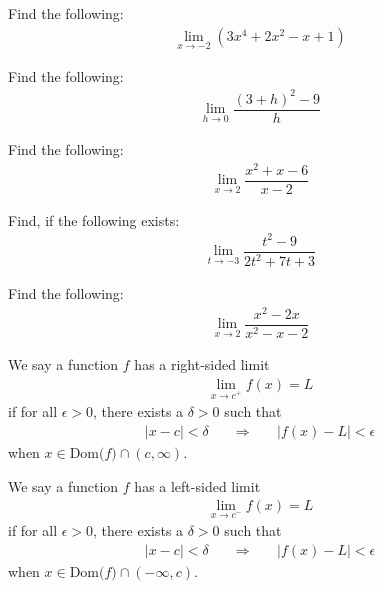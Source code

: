 \begin{exercise}
Find the following:
\begin{align*}
\lim_{x \longrightarrow -2} (3x^{4}+2x^{2}-x+1)
\end{align*}
\end{exercise}

\begin{exercise} Find the following:
\begin{align*}
    \lim_{h \longrightarrow 0} \dfrac{(3+h)^{2} - 9}{h}
\end{align*}
\end{exercise}

\begin{exercise}
Find the following:
\begin{align*}
    \lim_{x \longrightarrow 2} \dfrac{x^{2}+x-6}{x-2}
\end{align*}
\end{exercise}

\begin{exercise}
Find, if the following exists:
\begin{align*}
  \lim_{t \longrightarrow -3} \dfrac{t^{2} - 9}{2t^{2} + 7t + 3}
\end{align*}
\end{exercise}

\begin{exercise}
Find the following:
\begin{align*}
    \lim_{x \longrightarrow 2} \dfrac{x^{2}-2x}{x^{2}-x-2}
\end{align*}
\end{exercise}

\begin{definition}
We say a function $f$ has a right-sided limit
\begin{align*}
    \lim_{x \longrightarrow c^{+}} f(x) = L
\end{align*}
if for all $\epsilon > 0$, there exists a $\delta > 0$ such that
\begin{align*}
    \lvert x - c \rvert < \delta \hspace{20pt} \Longrightarrow \hspace{20pt} \lvert f(x) - L \rvert < \epsilon
\end{align*}
when $x \in \text{Dom($f$)} \cap (c, \infty)$.
\end{definition}

\begin{definition}
We say a function $f$ has a left-sided limit
\begin{align*}
    \lim_{x \longrightarrow c^{-}} f(x) = L
\end{align*}
if for all $\epsilon > 0$, there exists a $\delta > 0$ such that
\begin{align*}
    \lvert x - c \rvert < \delta \hspace{20pt} \Longrightarrow \hspace{20pt} \lvert f(x) - L \rvert < \epsilon
\end{align*}
when $x \in \text{Dom($f$)} \cap (-\infty, c)$.
\end{definition}

